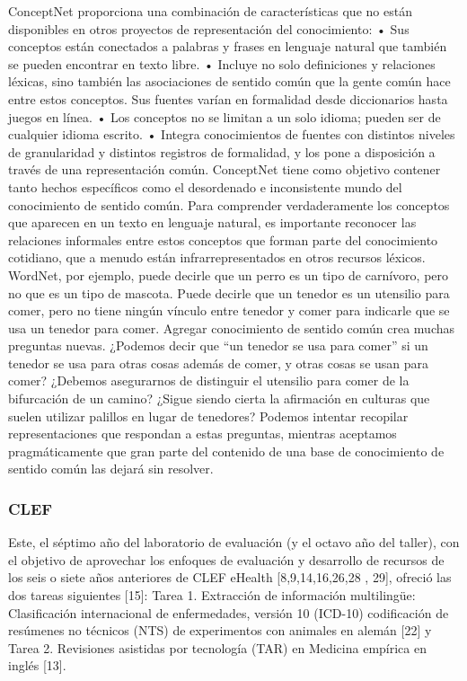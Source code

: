 ConceptNet proporciona una combinación de características que no están disponibles en otros proyectos de representación del conocimiento: • Sus conceptos están conectados a palabras y frases en lenguaje natural que también se pueden encontrar en texto libre. • Incluye no solo definiciones y relaciones léxicas, sino también las asociaciones de sentido común que la gente común hace entre estos conceptos. Sus fuentes varían en formalidad desde diccionarios hasta juegos en línea. • Los conceptos no se limitan a un solo idioma; pueden ser de cualquier idioma escrito. • Integra conocimientos de fuentes con distintos niveles de granularidad y distintos registros de formalidad, y los pone a disposición a través de una representación común. ConceptNet tiene como objetivo contener tanto hechos específicos como el desordenado e inconsistente mundo del conocimiento de sentido común. Para comprender verdaderamente los conceptos que aparecen en un texto en lenguaje natural, es importante reconocer las relaciones informales entre estos conceptos que forman parte del conocimiento cotidiano, que a menudo están infrarrepresentados en otros recursos léxicos. WordNet, por ejemplo, puede decirle que un perro es un tipo de carnívoro, pero no que es un tipo de mascota. Puede decirle que un tenedor es un utensilio para comer, pero no tiene ningún vínculo entre tenedor y comer para indicarle que se usa un tenedor para comer. Agregar conocimiento de sentido común crea muchas preguntas nuevas. ¿Podemos decir que “un tenedor se usa para comer” si un tenedor se usa para otras cosas además de comer, y otras cosas se usan para comer? ¿Debemos asegurarnos de distinguir el utensilio para comer de la bifurcación de un camino? ¿Sigue siendo cierta la afirmación en culturas que suelen utilizar palillos en lugar de tenedores? Podemos intentar recopilar representaciones que respondan a estas preguntas, mientras aceptamos pragmáticamente que gran parte del contenido de una base de conocimiento de sentido común las dejará sin resolver.

\subsubsection*{CLEF}

Este, el séptimo año del laboratorio de evaluación (y el octavo año del taller), con el objetivo de aprovechar los enfoques de evaluación y desarrollo de recursos de los seis o siete años anteriores de CLEF eHealth [8,9,14,16,26,28 , 29], ofreció las dos tareas siguientes [15]: Tarea 1. Extracción de información multilingüe: Clasificación internacional de enfermedades, versión 10 (ICD-10) codificación de resúmenes no técnicos (NTS) de experimentos con animales en alemán [22] y Tarea 2. Revisiones asistidas por tecnología (TAR) en Medicina empírica en inglés [13].

